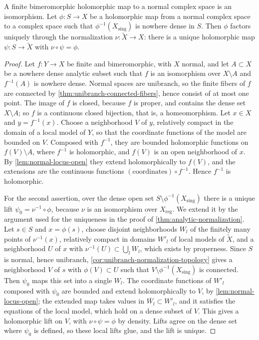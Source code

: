 \begin{corollary}\label{cor:finite-bimeromorphic-normal-target}
A finite bimeromorphic holomorphic map to a normal complex space is an isomorphism. Let $\phi\colon S\to X$ be a holomorphic map from a normal complex space to a complex space such that $\phi^{-1}(X_{\mathrm{sing}})$ is nowhere dense in $S$. Then $\phi$ factors uniquely through the normalization $\nu\colon\widetilde X\to X$: there is a unique holomorphic map $\psi\colon S\to\widetilde X$ with $\nu\circ\psi=\phi$.
\end{corollary}
\begin{proof}
Let $f\colon Y\to X$ be finite and bimeromorphic, with $X$ normal, and let $A\subset X$ be a nowhere dense analytic subset such that $f$ is an isomorphism over $X\setminus A$ and $f^{-1}(A)$ is nowhere dense. Normal spaces are unibranch, so the finite fibers of $f$ are connected by \cref{thm:unibranch-connected-fibers}, hence consist of at most one point. The image of $f$ is closed, because $f$ is proper, and contains the dense set $X\setminus A$; so $f$ is a continuous closed bijection, that is, a homeomorphism. Let $x\in X$ and $y=f^{-1}(x)$. Choose a neighborhood $V$ of $y$, relatively compact in the domain of a local model of $Y$, so that the coordinate functions of the model are bounded on $V$. Composed with $f^{-1}$, they are bounded holomorphic functions on $f(V)\setminus A$, where $f^{-1}$ is holomorphic, and $f(V)$ is an open neighborhood of $x$. By \cref{lem:normal-locus-open} they extend holomorphically to $f(V)$, and the extensions are the continuous functions $(\text{coordinates})\circ f^{-1}$. Hence $f^{-1}$ is holomorphic.

For the second assertion, over the dense open set $S\setminus\phi^{-1}(X_{\mathrm{sing}})$ there is a unique lift $\psi_0=\nu^{-1}\circ\phi$, because $\nu$ is an isomorphism over $X_{\mathrm{reg}}$. We extend it by the argument used for the uniqueness in the proof of \cref{thm:analytic-normalization}. Let $s\in S$ and $x=\phi(s)$, choose disjoint neighborhoods $W_l$ of the finitely many points of $\nu^{-1}(x)$, relatively compact in domains $W'_l$ of local models of $\widetilde X$, and a neighborhood $U$ of $x$ with $\nu^{-1}(U)\subset\bigcup_lW_l$, which exists by properness. Since $S$ is normal, hence unibranch, \cref{cor:unibranch-normalization-topology} gives a neighborhood $V$ of $s$ with $\phi(V)\subset U$ such that $V\setminus\phi^{-1}(X_{\mathrm{sing}})$ is connected. Then $\psi_0$ maps this set into a single $W_l$. The coordinate functions of $W'_l$ composed with $\psi_0$ are bounded and extend holomorphically to $V$, by \cref{lem:normal-locus-open}; the extended map takes values in $\overline{W_l}\subset W'_l$, and it satisfies the equations of the local model, which hold on a dense subset of $V$. This gives a holomorphic lift on $V$, with $\nu\circ\psi=\phi$ by density. Lifts agree on the dense set where $\psi_0$ is defined, so these local lifts glue, and the lift is unique.
\end{proof}

